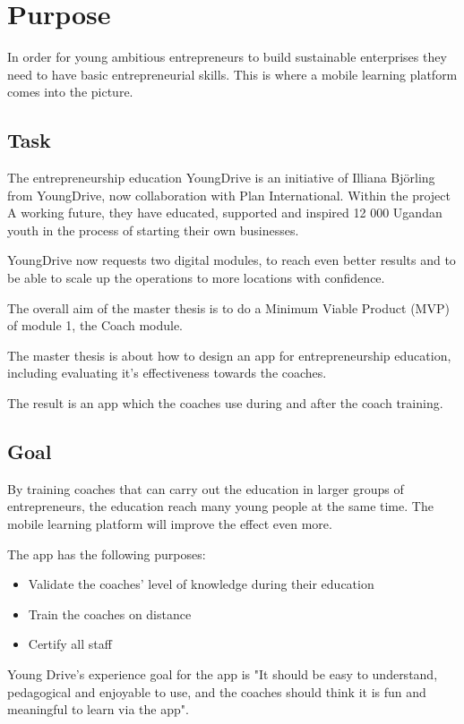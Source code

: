 \section{Purpose}

In order for young ambitious entrepreneurs to build sustainable enterprises they need to have basic entrepreneurial skills. This is where a mobile learning platform comes into the picture.

\subsection{Task}
The entrepreneurship education YoungDrive is an initiative of Illiana Björling from YoungDrive, now collaboration with Plan International. Within the project A working future, they have educated, supported and inspired 12 000 Ugandan youth in the process of starting their own businesses. \cite{nissar-linkedin}

YoungDrive now requests two digital modules, to reach even better results and to be able to scale up the operations to more locations with confidence.

The overall aim of the master thesis is to do a Minimum Viable Product (MVP) of module 1, the Coach module.

The master thesis is about how to design an app for entrepreneurship education, including evaluating it's effectiveness towards the coaches.

The result is an app which the coaches use during and after the coach training.

\subsection{Goal}

By training coaches that can carry out the education in larger groups of entrepreneurs, the education reach many young people at the same time. The mobile learning platform will improve the effect even more.

The app has the following purposes:

\begin{itemize}
  \item Validate the coaches' level of knowledge during their education
    \item Train the coaches on distance
    \item Certify all staff
\end{itemize}

Young Drive's experience goal for the app is "It should be easy to understand, pedagogical and enjoyable to use, and the coaches should think it is fun and meaningful to learn via the app".
